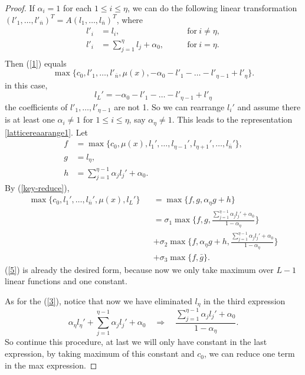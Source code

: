 \begin{proof}
		If $\alpha_i=1$ for each $1\le i\le\eta$, we can do the following linear transformation $(l'_1,\dots,l'_{\bar{n}})^T=A(l_1,\dots,l_{\bar{n}})^T$, where
		\begin{equation*}
		\begin{aligned}
		l'_i&=l_i,\qquad &\mathrm{for}\ i\ne\eta,\\
		l'_i&=\sum_{j=1}^{\eta} l_j+\alpha_0,\qquad &\mathrm{for}\ i=\eta.\\
		\end{aligned}
		\end{equation*} 
		Then (\ref{1}) equals 
		$$
		\max\{c_0,l'_1,\dots,l'_{\bar{n}},\mu(x),-\alpha_0-l'_1-\dots-l'_{\eta-1}+l'_{\eta}\}.
		$$
		in this case, 
		$$
		l_L'=-\alpha_0-l'_1-\dots-l'_{\eta-1}+l'_{\eta}
		$$
		the coefficients of $l'_1,\dots,l'_{\eta-1}$ are not 1. So we can rearrange $l_i'$ and assume there is at least one $\alpha_i\ne1$ for $1\le i\le\eta$, say $\alpha_{\eta}\ne1$. This leads to the representation \eqref{latticereaarange1}. Let
		\begin{equation*}
		\begin{aligned}
		f&=\max\{c_0,\mu(x),l_1',\dots,l_{\eta-1}',l_{\eta+1}',\dots,l_{\bar{n}}'\},\\
		g&=l_{\eta},\\
		h&=\sum_{j=1}^{\eta-1}\alpha_j l_j'+\alpha_0.
		\end{aligned}
		\end{equation*}
		By (\ref{key-reduce}), 
		\begin{eqnarray}\label{2}
		\max\{c_0,l_1',\dots,l_{\bar{n}}',\mu(x),l_L'\}&&=\max\{f,g,\alpha_{\eta} g+h  \}\\ 
		\label{3}
		&&=\sigma_1\max\{f,g,\frac{\sum_{j=1}^{\eta-1}\alpha_j l_j'+\alpha_0}{1-\alpha_{\eta}}  \}\\ 
		\label{4}
		&&+\sigma_2\max\{f,\alpha_{\eta} g+h,\frac{\sum_{j=1}^{\eta-1}\alpha_j l_j'+\alpha_0}{1-\alpha_{\eta}}   \}\\ 
		\label{5}
		&&+\sigma_3\max\{f,\bar{g} \}.
		\end{eqnarray}
		(\ref{5}) is already the desired form, because now we only take maximum  over $L-1$ linear functions and one constant.
		
		As for the (\ref{3}), notice that now we have eliminated $l_{\eta}$ in the third expression
		$$
		\alpha_\eta l_\eta'+\sum_{j=1}^{\eta-1}\alpha_j l_j'+\alpha_0\quad \Rightarrow \quad \frac{\sum_{j=1}^{\eta-1}\alpha_j l_j'+\alpha_0}{1-\alpha_{\eta}}.
		$$ 
		So continue this procedure, at last we will only have constant in the last expression, by taking maximum of this constant and $c_0$, we can reduce one term in the max expression.
		

\end{proof}
